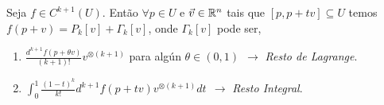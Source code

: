 \begin{corollary}
    Seja \(f\in C^{k+1}(U)\). Então \(\forall p\in U\) e \(\vec{v}\in \mathbb{R}^n\) tais que \([p,p+tv]\subseteq U\) temos \(f(p+v) = P_k[v] + \Gamma_k[v]\), onde \(\Gamma_k[v]\) pode ser, 
    \begin{enumerate}[label = \roman*.]
        \item \(\frac{d^{k+1}f(p+\theta v)}{(k+1)!}  v^{\otimes (k+1)}\) para algún \(\theta \in (0,1)\ \ \rightarrow \) \emph{Resto de Lagrange}. 
        \item \(\int_0^1 \frac{(1-t)^k}{k!} d^{k+1}f(p+tv) v^{\otimes (k+1)} dt\ \ \rightarrow  \)  \emph{Resto Integral}. 
    \end{enumerate}
\end{corollary}
